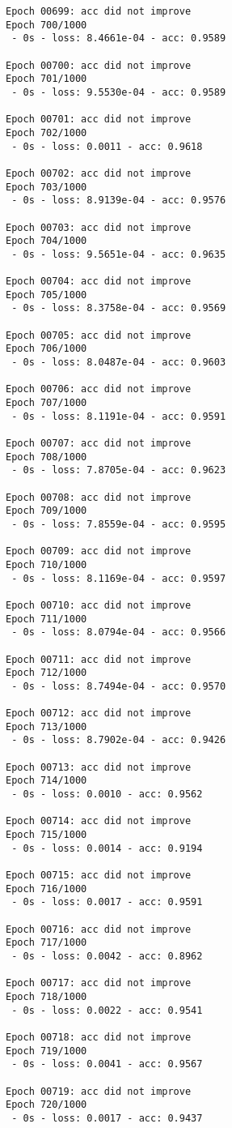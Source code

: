 \documentclass[11pt]{article}
\begin{document}
\begin{Verbatim}[commandchars=\\\{\}]
Epoch 00699: acc did not improve
Epoch 700/1000
 - 0s - loss: 8.4661e-04 - acc: 0.9589

Epoch 00700: acc did not improve
Epoch 701/1000
 - 0s - loss: 9.5530e-04 - acc: 0.9589

Epoch 00701: acc did not improve
Epoch 702/1000
 - 0s - loss: 0.0011 - acc: 0.9618

Epoch 00702: acc did not improve
Epoch 703/1000
 - 0s - loss: 8.9139e-04 - acc: 0.9576

Epoch 00703: acc did not improve
Epoch 704/1000
 - 0s - loss: 9.5651e-04 - acc: 0.9635

Epoch 00704: acc did not improve
Epoch 705/1000
 - 0s - loss: 8.3758e-04 - acc: 0.9569

Epoch 00705: acc did not improve
Epoch 706/1000
 - 0s - loss: 8.0487e-04 - acc: 0.9603

Epoch 00706: acc did not improve
Epoch 707/1000
 - 0s - loss: 8.1191e-04 - acc: 0.9591

Epoch 00707: acc did not improve
Epoch 708/1000
 - 0s - loss: 7.8705e-04 - acc: 0.9623

Epoch 00708: acc did not improve
Epoch 709/1000
 - 0s - loss: 7.8559e-04 - acc: 0.9595

Epoch 00709: acc did not improve
Epoch 710/1000
 - 0s - loss: 8.1169e-04 - acc: 0.9597

Epoch 00710: acc did not improve
Epoch 711/1000
 - 0s - loss: 8.0794e-04 - acc: 0.9566

Epoch 00711: acc did not improve
Epoch 712/1000
 - 0s - loss: 8.7494e-04 - acc: 0.9570

Epoch 00712: acc did not improve
Epoch 713/1000
 - 0s - loss: 8.7902e-04 - acc: 0.9426

Epoch 00713: acc did not improve
Epoch 714/1000
 - 0s - loss: 0.0010 - acc: 0.9562

Epoch 00714: acc did not improve
Epoch 715/1000
 - 0s - loss: 0.0014 - acc: 0.9194

Epoch 00715: acc did not improve
Epoch 716/1000
 - 0s - loss: 0.0017 - acc: 0.9591

Epoch 00716: acc did not improve
Epoch 717/1000
 - 0s - loss: 0.0042 - acc: 0.8962

Epoch 00717: acc did not improve
Epoch 718/1000
 - 0s - loss: 0.0022 - acc: 0.9541

Epoch 00718: acc did not improve
Epoch 719/1000
 - 0s - loss: 0.0041 - acc: 0.9567

Epoch 00719: acc did not improve
Epoch 720/1000
 - 0s - loss: 0.0017 - acc: 0.9437


\end{Verbatim}
\end{document}
